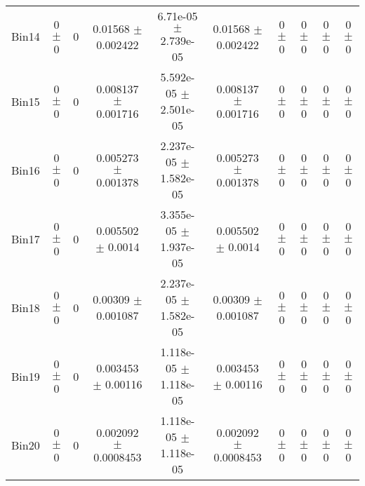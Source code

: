 \begin{tabular}{@{\extracolsep{4pt}}lccccccccc@{}}
     Bin14 & 0 $\pm$ 0 & 0 & 0.01568 $\pm$ 0.002422 & 6.71e-05 $\pm$ 2.739e-05 & 0.01568 $\pm$ 0.002422 & 0 $\pm$ 0 & 0 $\pm$ 0 & 0 $\pm$ 0 & 0 $\pm$ 0 \\ 
     Bin15 & 0 $\pm$ 0 & 0 & 0.008137 $\pm$ 0.001716 & 5.592e-05 $\pm$ 2.501e-05 & 0.008137 $\pm$ 0.001716 & 0 $\pm$ 0 & 0 $\pm$ 0 & 0 $\pm$ 0 & 0 $\pm$ 0 \\ 
     Bin16 & 0 $\pm$ 0 & 0 & 0.005273 $\pm$ 0.001378 & 2.237e-05 $\pm$ 1.582e-05 & 0.005273 $\pm$ 0.001378 & 0 $\pm$ 0 & 0 $\pm$ 0 & 0 $\pm$ 0 & 0 $\pm$ 0 \\ 
     Bin17 & 0 $\pm$ 0 & 0 & 0.005502 $\pm$ 0.0014 & 3.355e-05 $\pm$ 1.937e-05 & 0.005502 $\pm$ 0.0014 & 0 $\pm$ 0 & 0 $\pm$ 0 & 0 $\pm$ 0 & 0 $\pm$ 0 \\ 
     Bin18 & 0 $\pm$ 0 & 0 & 0.00309 $\pm$ 0.001087 & 2.237e-05 $\pm$ 1.582e-05 & 0.00309 $\pm$ 0.001087 & 0 $\pm$ 0 & 0 $\pm$ 0 & 0 $\pm$ 0 & 0 $\pm$ 0 \\ 
     Bin19 & 0 $\pm$ 0 & 0 & 0.003453 $\pm$ 0.00116 & 1.118e-05 $\pm$ 1.118e-05 & 0.003453 $\pm$ 0.00116 & 0 $\pm$ 0 & 0 $\pm$ 0 & 0 $\pm$ 0 & 0 $\pm$ 0 \\ 
     Bin20 & 0 $\pm$ 0 & 0 & 0.002092 $\pm$ 0.0008453 & 1.118e-05 $\pm$ 1.118e-05 & 0.002092 $\pm$ 0.0008453 & 0 $\pm$ 0 & 0 $\pm$ 0 & 0 $\pm$ 0 & 0 $\pm$ 0 \\ 
\hline\hline
  \end{tabular}
